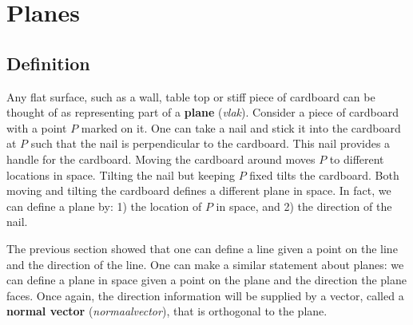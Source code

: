 \section{Planes}\label{sec:planes}
\subsection{Definition}
\ifcourse
	\checkoddpage
{}
 \fi
Any flat surface, such as a wall, table top or stiff piece of cardboard can be thought of as representing part of a \textbf{plane} (\textit{vlak}). Consider a piece of cardboard with a point $P$ marked on it. One can take a nail and stick it into the cardboard at $P$ such that the nail is perpendicular to the cardboard. This nail provides a handle for the cardboard. Moving the cardboard around moves $P$ to different locations in space. Tilting the nail but keeping $P$ fixed tilts the cardboard. Both moving and tilting the cardboard defines a different plane in space. In fact, we can define a plane by: 1) the location of $P$ in space, and 2) the direction of the nail.
 

The previous section showed that one can define a line given a point on the line and the direction of the line. One can make a similar statement about planes: we can define a plane in space given a point on the plane and the direction the plane faces. Once again, the direction information will be supplied by a vector, called a \textbf{normal vector} (\textit{normaalvector}), that is orthogonal to the plane.

